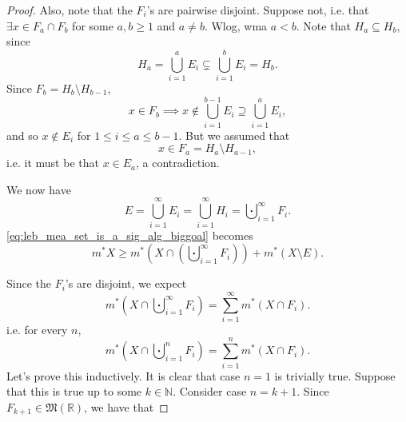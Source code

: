\documentclass[notoc,notitlepage]{tufte-book}
\begin{document}
\begin{proof}
  Also, note that the $F_i$'s are pairwise disjoint. Suppose not, i.e. that
  $\exists x \in F_a \cap F_b$ for some $a, b \geq 1$ and $a \neq b$. Wlog, wma
  $a < b$. Note that $H_a \subseteq H_b$, since
  \begin{equation*}
    H_a = \bigcup_{i=1}^{a} E_i \subsetneq \bigcup_{i=1}^{b} E_i = H_b.
  \end{equation*}
  Since $F_b = H_b \setminus H_{b - 1}$, 
  \begin{equation*}
    x \in F_b \implies x \notin \bigcup_{i=1}^{b-1} E_i \supseteq \bigcup_{i=1}^{a}
    E_i,
  \end{equation*}
  and so $x \notin E_i$ for $1 \leq i \leq a \leq b - 1$. But we assumed that
  \begin{equation*}
    x \in F_a = H_a \setminus H_{a - 1},
  \end{equation*}
  i.e. it must be that $x \in E_a$, a contradiction.

  \noindent
   We now have
  \begin{equation*}
    E = \bigcup_{i=1}^{\infty} E_i = \bigcup_{i=1}^{\infty} H_i =
    \bigcupdot_{i=1}^{\infty} F_i.
  \end{equation*}
  \cref{eq:leb_mea_set_is_a_sig_alg_biggoal} becomes 
  \begin{equation*}
    m^* X \geq m^* \left( X \cap \left( \bigcupdot_{i=1}^{\infty} F_i \right)
    \right) + m^* \left( X \setminus E \right).
  \end{equation*}

  Since the $F_i$'s are disjoint, we expect
  \begin{equation*}
    m^* \left( X \cap \bigcupdot_{i=1}^{\infty} F_i \right) =
    \sum_{i=1}^{\infty} m^* (X \cap F_i).
  \end{equation*}
  i.e. for every $n$,
  \begin{equation*}
    m^* \left( X \cap \bigcupdot_{i=1}^{n} F_i \right) =
    \sum_{i=1}^{n} m^* (X \cap F_i).
  \end{equation*}
  Let's prove this inductively. It is clear that case $n = 1$ is trivially true.
  Suppose that this is true up to some $k \in \mathbb{N}$. Consider case $n = k
  + 1$. Since $F_{k+1} \in \mathfrak{M}(\mathbb{R})$, we have that


\end{proof}
\end{document}
